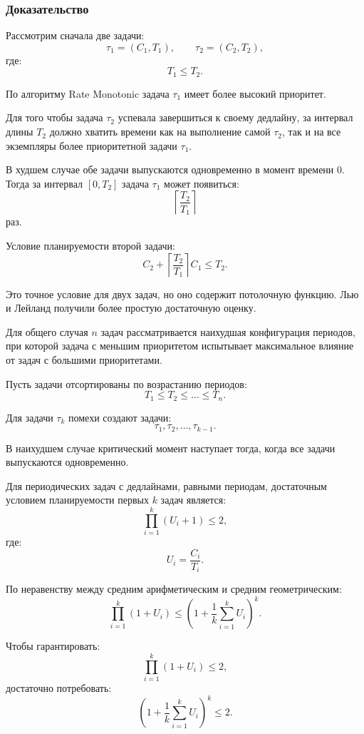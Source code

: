 \documentclass[12pt,a4paper]{article}
\begin{document}
\subsubsection{Доказательство}

Рассмотрим сначала две задачи:
\[
    \tau_1 = (C_1, T_1),
    \qquad
    \tau_2 = (C_2, T_2),
\]
где:
\[
    T_1 \leq T_2.
\]

По алгоритму Rate Monotonic задача $\tau_1$ имеет более высокий приоритет.

Для того чтобы задача $\tau_2$ успевала завершиться к своему дедлайну, за интервал длины $T_2$ должно хватить времени как на выполнение самой $\tau_2$, так и на все экземпляры более приоритетной задачи $\tau_1$.

В худшем случае обе задачи выпускаются одновременно в момент времени $0$. Тогда за интервал $[0,T_2]$ задача $\tau_1$ может появиться:
\[
    \left\lceil \frac{T_2}{T_1} \right\rceil
\]
раз.

Условие планируемости второй задачи:
\[
    C_2 + \left\lceil \frac{T_2}{T_1} \right\rceil C_1 \leq T_2.
\]

Это точное условие для двух задач, но оно содержит потолочную функцию. Лью и Лейланд получили более простую достаточную оценку.

Для общего случая $n$ задач рассматривается наихудшая конфигурация периодов, при которой задача с меньшим приоритетом испытывает максимальное влияние от задач с большими приоритетами.

Пусть задачи отсортированы по возрастанию периодов:
\[
    T_1 \leq T_2 \leq \dots \leq T_n.
\]

Для задачи $\tau_k$ помехи создают задачи:
\[
    \tau_1, \tau_2, \dots, \tau_{k-1}.
\]

В наихудшем случае критический момент наступает тогда, когда все задачи выпускаются одновременно.

Для периодических задач с дедлайнами, равными периодам, достаточным условием планируемости первых $k$ задач является:
\[
    \prod_{i=1}^{k} (U_i + 1) \leq 2,
\]
где:
\[
    U_i = \frac{C_i}{T_i}.
\]

По неравенству между средним арифметическим и средним геометрическим:
\[
    \prod_{i=1}^{k} (1 + U_i)
    \leq
    \left(
        1 + \frac{1}{k}\sum_{i=1}^{k} U_i
    \right)^k.
\]

Чтобы гарантировать:
\[
    \prod_{i=1}^{k} (1 + U_i) \leq 2,
\]
достаточно потребовать:
\[
    \left(
        1 + \frac{1}{k}\sum_{i=1}^{k} U_i
    \right)^k
    \leq 2.
\]
\end{document}
